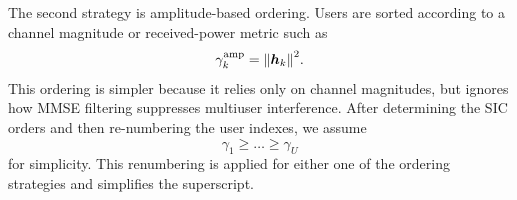 The second strategy is amplitude-based ordering. Users are sorted according to a channel magnitude or received-power metric such as
\begin{equation}
    \gamma^{\mathrm{amp}}_k=\norm{\bm{h}_k}^2.
\end{equation}
This ordering is simpler because it relies only on channel magnitudes, but ignores how MMSE filtering suppresses multiuser interference.
After determining the SIC orders and then re-numbering the user indexes, we assume 
\begin{equation}
    \label{eq:detection order}
    \gamma_1 \geq \ldots \geq \gamma_U
\end{equation}
for simplicity.
This renumbering is applied for either one of the ordering strategies and simplifies the superscript.

